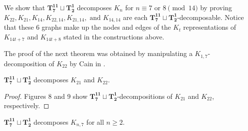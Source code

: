 \documentclass{dmgt}
\begin{document}
We show that $\mathbf{T_{7}^{11}}\sqcup\mathbf{T_{2}^{1}}$ decomposes $K_{n}$ for $n\equiv7 \textrm{ or }8\pmod{14}$ by proving $K_{22},K_{21},K_{14},K_{22,14},K_{21,14},\text{ and }K_{14,14}$ are each $\mathbf{T_{7}^{11}}\sqcup\mathbf{T_{2}^{1}}$-decomposable. Notice that these 6 graphs make up the nodes and edges of the $K_{t}$ representations of $K_{14t+7}$ and $K_{14t+8}$ stated in the constructions above.

\noindent The proof of the next theorem was obtained by manipulating a $K_{1,7}$-decomposition of $K_{22}$ by Cain in \cite{bib:Cain}.

\begin{theorem}\label{thm:PCstarpath}
    $\mathbf{T_{7}^{11}}\sqcup\mathbf{T_{2}^{1}}$ decomposes $K_{21}$ and $K_{22}$.
\end{theorem}

\begin{proof}
     Figures 8 and 9 show $\mathbf{T_{7}^{11}}\sqcup\mathbf{T_{2}^{1}}$-decompositions of $K_{21}$ and $K_{22}$, respectively.  %
\end{proof}

\begin{theorem} \label{thm:K_n,7}
    $\mathbf{T_{7}^{11}}\sqcup\mathbf{T_{2}^{1}}$ decomposes $K_{n,7}$ for all $n\geq 2$.
\end{theorem}
\end{document}
